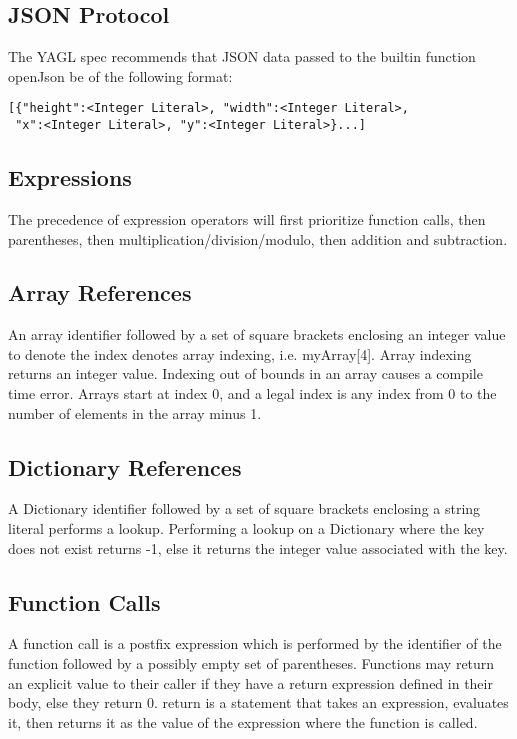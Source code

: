 \documentclass[12pt]{article}
\begin{document}
\subsection{JSON Protocol}
The YAGL spec recommends that JSON data passed to the 
builtin function openJson be of the following format:
\begin{lstlisting}
[{"height":<Integer Literal>, "width":<Integer Literal>,
 "x":<Integer Literal>, "y":<Integer Literal>}...]
\end{lstlisting}

\subsection{Expressions}
The precedence of expression operators will first prioritize function calls, then parentheses, then multiplication/division/modulo, then addition and subtraction.  

\subsection{Array References}
An array identifier followed by a set of square brackets enclosing an integer value to denote the index denotes array indexing, i.e. myArray[4].  Array indexing returns an integer value.  Indexing out of bounds in an array causes a compile time error.  Arrays start at index 0, and a legal index is any index from 0 to the number of elements in the array minus 1.

\subsection{Dictionary References}
A Dictionary identifier followed by a set of square brackets enclosing a string literal performs a lookup. Performing a lookup on a Dictionary where the key does not exist returns -1, else it returns the integer value associated with the key.

\subsection{Function Calls}
A function call is a postfix expression which is performed by the identifier of the function
followed by a possibly empty set of parentheses. Functions may return an explicit value to their caller if they have a return expression defined in their body, else they return 0.  return is a statement that takes an expression, evaluates it, then returns it as the value of the expression where the function is called.
\end{document}
